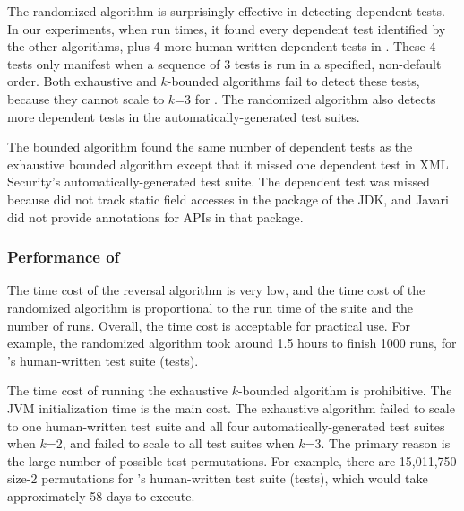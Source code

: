 The randomized algorithm is surprisingly effective in
detecting dependent tests. In our experiments, when run \trialnum times,
it found every
dependent test identified by the other algorithms, plus 
4 more human-written dependent
tests in \jt. These 4 tests only
manifest when a sequence of 3 tests is run in a specified,
non-default order. Both exhaustive and \dependenceaware{} $k$-bounded
algorithms fail to detect these tests, because
they cannot scale to $k$=3 for 
\jt.  The randomized algorithm also
detects more dependent
tests in the automatically-generated test suites.

The \dependenceaware{} bounded algorithm found the same
number of dependent tests as the exhaustive bounded algorithm
except that it missed one dependent test in XML Security's
automatically-generated test suite.
The dependent test was missed because \ourtool
did not track static field accesses in the  package
of the JDK, and Javari did not provide annotations for APIs
in that package.


\subsubsection{Performance of \ourtool}
\label{sec:performance}

The time cost of the reversal algorithm is very low, and
the time cost of the randomized algorithm 
is proportional to the run time of the suite and the number of runs.
Overall, the time cost is acceptable for practical use.
For example, the randomized algorithm took around 1.5 hours
to finish 1000 runs,  for \jt's human-written test
suite (\jodatimetests tests).
 
The time cost of running the exhaustive $k$-bounded algorithm
is prohibitive. The JVM initialization time is the main cost.
The exhaustive algorithm failed to
scale to one human-written test suite and all four automatically-generated
test suites when $k$=2, and failed to scale to all test suites
when $k$=3. The primary reason is the large
number of possible test permutations. 
For example, there are 15,011,750 size-2 permutations
for \jt's human-written test suite (\jodatimetests tests),
which would take approximately 58 days to execute.

